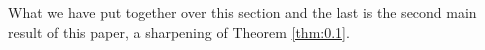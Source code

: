 \documentclass{amsart}
\theoremstyle{definition}
\newtheorem{rem}[thm]{Remark}
\begin{document}
What we have put together over this section and the last is the second main result of this paper, a sharpening of Theorem \ref{thm:0.1}.


\end{document}
